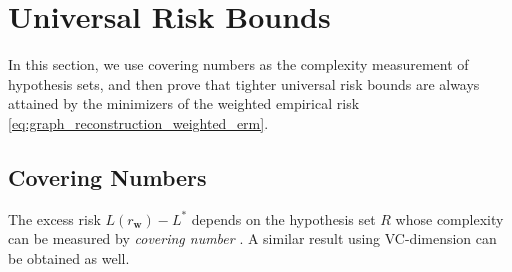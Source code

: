 \documentclass[letterpaper]{article} %
\newcommand{\weight}{\mathbf{w}}
\newcommand{\bayeserror}{L^*}
\newcommand{\risk}{L}
\newcommand{\red}[1]{\textcolor{red}{#1}}
\newcommand{\todo}[1]{\red{\textsc{todo:} #1}}
\newcommand{\citep}[3]{(#1\ \citeauthor{#3}\ \citeyear{#3},\ #2)}
\begin{document}
\section{Universal Risk Bounds} %
\label{sec:risk_bounds}
In this section, we use covering numbers as the complexity measurement of hypothesis sets, and then prove that tighter universal risk bounds are always attained by the minimizers of the weighted empirical risk \eqref{eq:graph_reconstruction_weighted_erm}.

\subsection{Covering Numbers} %
\label{sub:covering number}
The excess risk $\risk{}(r_\weight{})-\bayeserror{}$ depends on the hypothesis set $R$ whose complexity can be measured by \emph{covering number} \cite{cucker2007learning}. 
A similar result using VC-dimension \cite{vapnik1971uniform} can be obtained as well. 
\end{document}
